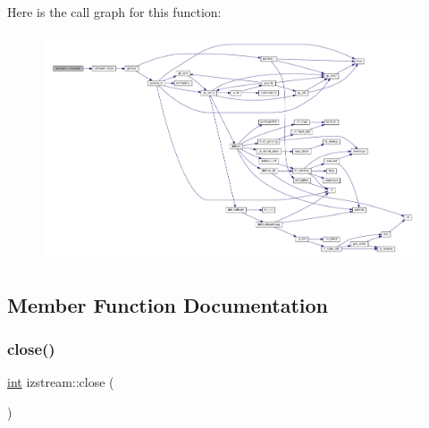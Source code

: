 Here is the call graph for this function\+:
\nopagebreak
\begin{figure}[H]
\begin{center}
\leavevmode
\includegraphics[width=350pt]{classizstream_a55310a1de984e596df7b4236193ea1c3_cgraph}
\end{center}
\end{figure}


\subsection{Member Function Documentation}
\mbox{\label{classizstream_ac2a7342deb79761277e846c8b24ef92a}} 
\subsubsection{\texorpdfstring{close()}{close()}}
{\footnotesize\ttfamily \mbox{\hyperlink{ioapi_8h_a787fa3cf048117ba7123753c1e74fcd6}{int}} izstream\+::close (\begin{DoxyParamCaption}{ }\end{DoxyParamCaption})\hspace{0.3cm}{\ttfamily [inline]}}

